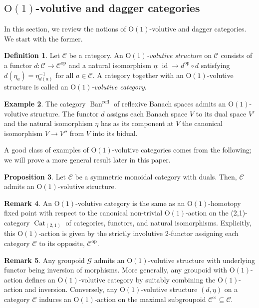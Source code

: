 \documentclass{article}
\newcommand{\opp}{\operatorname{op}}%
\newcommand{\id}{\operatorname{id}}%
\newcommand{\Cat}{\operatorname{Cat}}%
\newcommand{\Ban}{\operatorname{Ban}}%
\newcommand{\refl}{\operatorname{refl}}%
\newcommand{\Oone}{\operatorname{O(1)}}
\newcommand{\C}{\mathcal{C}}
\newcommand{\G}{\mathcal{G}}
\numberwithin{equation}{section}
\theoremstyle{definition}
\newtheorem{definition}{Definition}[subsection]
\newtheorem{example}[definition]{Example}
\newtheorem{proposition}[definition]{Proposition}
\newtheorem{remark}[definition]{Remark}
\theoremstyle{theorem}
\begin{document}
\subsection{$\Oone$-volutive and dagger categories}
In this section, we review the notions of $\Oone$-volutive and dagger categories. We start with the former.
\begin{definition}\label{Definition: O(1)-volutive category}
    Let $\C$ be a category. An \emph{$\Oone$-volutive structure} on $\C$ consists of a functor $d \colon \C \to \C^{\opp}$ and a natural isomorphism 
    $\eta \colon \id \to d^{\opp} \circ d$ satisfying $d(\eta_a) = \eta_{d(a)}^{-1}$ for all $a \in \C$. 
    A category together with an $\Oone$-volutive structure is called an \emph{$\Oone$-volutive category}.
\end{definition}
\begin{example}\label{Example: Banach spaces are Oone volutive}
    The category $\Ban^{\refl}$ of reflexive Banach spaces admits an $\Oone$-volutive structure. The functor $d$ assigns each Banach space $V$ to its 
    dual space $V'$ and the natural isomorphism $\eta$ has as its component at $V$ the canonical isomorphism $V \to V''$ from $V$ into its bidual. 
\end{example}
A good class of examples of $\Oone$-volutive categories comes from the following; we will prove a more general result later in this paper.
\begin{proposition}\label{Proposition: rigid symmetric monoidal categories are Oone volutive}
    Let $\C$ be a symmetric monoidal category with duals. Then, $\C$ admits an $\Oone$-volutive structure. 
\end{proposition}
\begin{remark}\label{Remark: Oone volutive categories as homotopy fixed points}
    An $\Oone$-volutive category is the same as an $\Oone$-homotopy fixed point with respect to the canonical non-trivial $\Oone$-action on the (2,1)-category 
    $\Cat_{(2,1)}$ of categories, functors, and natural isomorphisms. Explicitly, this $\Oone$-action is given by the strictly involutive 2-functor assigning 
    each category $\C$ to its opposite, $\C^{\opp}$. 
\end{remark}
\begin{remark}\label{Remark: Oone volutive structures and groupoids}
    Any groupoid $\G$ admits an $\Oone$-volutive structure with underlying functor being inversion of morphisms. More generally, any groupoid with $\Oone$-action 
    defines an $\Oone$-volutive category by suitably combining the $\Oone$-action and inversion. Conversely, any $\Oone$-volutive structure $(d,\eta)$ on a 
    category $\C$ induces an $\Oone$-action on the maximal subgroupoid $\C^\times \subseteq \C$. 
\end{remark}
\end{document}
